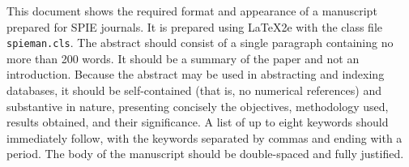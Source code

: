 This document shows the required format and appearance of a manuscript prepared for SPIE journals. It is prepared using LaTeX2e with the class file \texttt{spieman.cls}. The abstract should consist of a single paragraph containing no more than 200 words. It should be a summary of the paper and not an introduction. Because the abstract may be used in abstracting and indexing databases, it should be self-contained (that is, no numerical references) and substantive in nature, presenting concisely the objectives, methodology used, results obtained, and their significance. A list of up to eight keywords should immediately follow, with the keywords separated by commas and ending with a period. The body of the manuscript should be double-spaced and fully justified.
